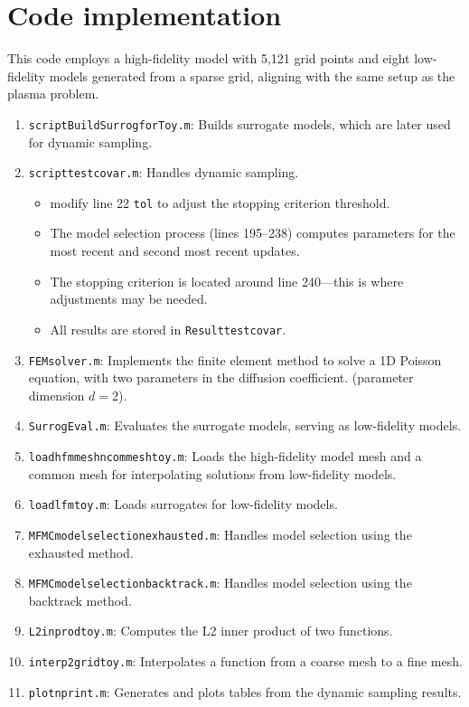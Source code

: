 \documentclass[final,3p,times,11pt]{article}
\begin{document}
\section{Code implementation}
This code employs a high-fidelity model with 5,121 grid points and eight low-fidelity models generated from a sparse grid, aligning with the same setup as the plasma problem.
\begin{enumerate}
    \item\texttt{script\textunderscore BuildSurrogforToy.m}: Builds surrogate models, which are later used for dynamic sampling.
    
    \item \texttt{script\textunderscore test\textunderscore covar.m}: Handles dynamic sampling.

    \begin{itemize}
        \item modify line 22 \texttt{tol}  to adjust the stopping criterion threshold.
        \item The model selection process (lines 195–238) computes parameters for the most recent and second most recent updates.
        \item The stopping criterion is located around line 240—this is where adjustments may be needed.
        \item All results are stored in \texttt{Result\textunderscore test\textunderscore covar}.
    \end{itemize}
    \item \texttt{FEM\textunderscore solver.m}:  Implements the finite element method to solve a 1D Poisson equation, with two parameters in the diffusion coefficient. (parameter dimension $d=2$).
    \item \texttt{Surrog\textunderscore Eval.m}: Evaluates the surrogate models, serving as low-fidelity models.
    \item \texttt{load\textunderscore hfm\textunderscore mesh\textunderscore n\textunderscore com\textunderscore mesh\textunderscore toy.m}: Loads the high-fidelity model mesh and a common mesh for interpolating solutions from low-fidelity models.
    \item \texttt{load\textunderscore lfm\textunderscore toy.m}: Loads surrogates for low-fidelity models.
    \item \texttt{MFMC\textunderscore model\textunderscore selection\textunderscore exhausted.m}: Handles model selection using the exhausted method.
    \item \texttt{MFMC\textunderscore model\textunderscore selection\textunderscore backtrack.m}: Handles model selection using the backtrack method.
    \item \texttt{L2\textunderscore inprod\textunderscore toy.m}: Computes the L2 inner product of two functions.
    \item \texttt{interp2grid\textunderscore toy.m}:  Interpolates a function from a coarse mesh to a fine mesh.
    \item \texttt{plot\textunderscore n\textunderscore print.m}: Generates and plots tables from the dynamic sampling results.
\end{enumerate}
\end{document}

